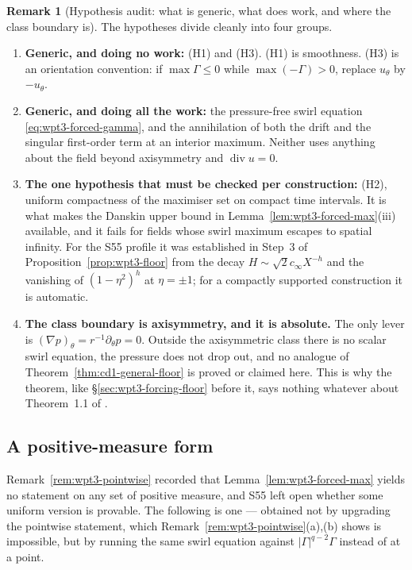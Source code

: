 \documentclass[11pt]{article}
\theoremstyle{definition}
\newtheorem{remark}[theorem]{Remark}
\theoremstyle{remark}
\newcommand{\abs}[1]{\left|#1\right|}
\newcommand{\grad}{\nabla}
\newcommand{\divg}{\operatorname{div}}
\begin{document}
\begin{remark}[Hypothesis audit: what is generic, what does work, and where
  the class boundary is]\label{rem:cd1-audit}
  The hypotheses divide cleanly into four groups.
  \begin{enumerate}[label=(\alph*),leftmargin=2.2em]
    \item \textbf{Generic, and doing no work:} (H1) and (H3). (H1) is
      smoothness. (H3) is an orientation convention: if $\max\Gamma\leq0$
      while $\max(-\Gamma)>0$, replace $u_\theta$ by $-u_\theta$.
    \item \textbf{Generic, and doing all the work:} the pressure-free swirl
      equation \eqref{eq:wpt3-forced-gamma}, and the annihilation of both the
      drift and the singular first-order term at an interior maximum. Neither
      uses anything about the field beyond axisymmetry and $\divg u=0$.
    \item \textbf{The one hypothesis that must be checked per
      construction:} (H2), uniform compactness of the maximiser set on
      compact time intervals. It is what makes the Danskin upper bound in
      Lemma~\ref{lem:wpt3-forced-max}(iii) available, and it fails for fields
      whose swirl maximum escapes to spatial infinity. For the S55 profile it
      was established in Step~3 of Proposition~\ref{prop:wpt3-floor} from the
      decay $H\sim\sqrt2c_\infty X^{-h}$ and the vanishing of
      $(1-\eta^2)^h$ at $\eta=\pm1$; for a compactly supported construction
      it is automatic.
    \item \textbf{The class boundary is axisymmetry, and it is absolute.} The
      only lever is $(\grad p)_\theta=r^{-1}\partial_\theta p=0$. Outside the
      axisymmetric class there is no scalar swirl equation, the pressure does
      not drop out, and no analogue of
      Theorem~\ref{thm:cd1-general-floor} is proved or claimed here. This is
      why the theorem, like \S\ref{sec:wpt3-forcing-floor} before it, says
      nothing whatever about Theorem~1.1 of \cite{OpenAI2026}.
  \end{enumerate}
\end{remark}

\subsection{A positive-measure form}
\label{subsec:cd1-Lq}

Remark~\ref{rem:wpt3-pointwise} recorded that
Lemma~\ref{lem:wpt3-forced-max} yields no statement on any set of positive
measure, and S55 left open whether some uniform version is provable. The
following is one --- obtained not by upgrading the pointwise statement, which
Remark~\ref{rem:wpt3-pointwise}(a),(b) shows is impossible, but by running the
same swirl equation against $\abs\Gamma^{q-2}\Gamma$ instead of at a point.
\end{document}
